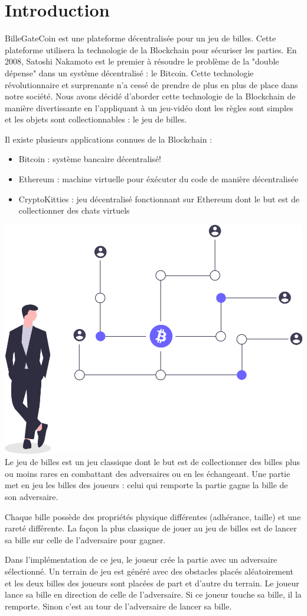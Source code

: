 \documentclass{article}
\begin{document}
\section{Introduction}
BilleGateCoin est une plateforme décentralisée pour un jeu de billes. Cette plateforme utilisera la technologie de la Blockchain pour sécuriser les parties. En 2008, Satoshi Nakamoto est le premier à résoudre le problème de la "double dépense" dans un système décentralisé : le Bitcoin. Cette technologie révolutionnaire et surprenante n'a cessé de prendre de plus en plus de place dans notre société. Nous avons décidé d'aborder cette technologie de la Blockchain de manière divertissante en l'appliquant à un jeu-vidéo dont les règles sont simples et les objets sont collectionnables : le jeu de billes.

Il existe plusieurs applications connues de la Blockchain :
\begin{itemize}
    \item Bitcoin : système bancaire décentralisé!
    \item Ethereum : machine virtuelle pour éxécuter du code de manière décentralisée
    \item CryptoKitties : jeu décentralisé fonctionnant sur Ethereum dont le but est de collectionner des chats virtuels
\end{itemize}

\includegraphics[width=0.3\linewidth]{assets/decentralized.png}\\

Le jeu de billes est un jeu classique dont le but est de collectionner des billes plus ou moins rares en combattant des adversaires ou en les échangeant. Une partie met en jeu les billes des joueurs : celui qui remporte la partie gagne la bille de son adversaire.

Chaque bille possède des propriétés physique différentes (adhérance, taille) et une rareté différente.
La façon la plus classique de jouer au jeu de billes est de lancer sa bille sur celle de l'adversaire pour gagner.


Dans l'implémentation de ce jeu, le joueur crée la partie avec un adversaire sélectionné.
Un terrain de jeu est généré avec des obstacles placés aléatoirement et les deux billes des joueurs sont placées de part et d'autre du terrain. Le joueur lance sa bille en direction de celle de l'adversaire. Si ce joueur touche sa bille, il la remporte. Sinon c'est au tour de l'adversaire de lancer sa bille. 
\end{document}
